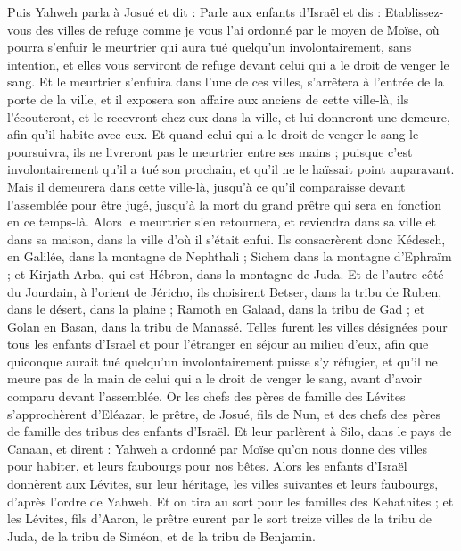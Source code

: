 \begin{multicols}{2}
\VerseOne{}Puis Yahweh parla à Josué et dit :
Parle aux enfants d'Israël et dis : Etablissez-vous des villes de refuge comme je vous l'ai ordonné par le moyen de Moïse,
où pourra s'enfuir le meurtrier qui aura tué quelqu'un involontairement, sans intention, et elles vous serviront de refuge devant celui qui a le droit de venger le sang.
Et le meurtrier s'enfuira dans l'une de ces villes, s'arrêtera à l'entrée de la porte de la ville, et il exposera son affaire aux anciens de cette ville-là, ils l'écouteront, et le recevront chez eux dans la ville, et lui donneront une demeure, afin qu'il habite avec eux.
Et quand celui qui a le droit de venger le sang le poursuivra, ils ne livreront pas le meurtrier entre ses mains ; puisque c'est involontairement qu'il a tué son prochain, et qu'il ne le haïssait point auparavant.
Mais il demeurera dans cette ville-là, jusqu'à ce qu'il comparaisse devant l'assemblée pour être jugé, jusqu'à la mort du grand prêtre qui sera en fonction en ce temps-là. Alors le meurtrier s'en retournera, et reviendra dans sa ville et dans sa maison, dans la ville d'où il s'était enfui.
Ils consacrèrent donc Kédesch, en Galilée, dans la montagne de Nephthali ; Sichem dans la montagne d'Ephraïm ; et Kirjath-Arba, qui est Hébron, dans la montagne de Juda.
Et de l'autre côté du Jourdain, à l'orient de Jéricho, ils choisirent Betser, dans la tribu de Ruben, dans le désert, dans la plaine ; Ramoth en Galaad, dans la tribu de Gad ; et Golan en Basan, dans la tribu de Manassé.
Telles furent les villes désignées pour tous les enfants d'Israël et pour l'étranger en séjour au milieu d'eux, afin que quiconque aurait tué quelqu'un involontairement puisse s'y réfugier, et qu'il ne meure pas de la main de celui qui a le droit de venger le sang, avant d'avoir comparu devant l'assemblée.
\VerseOne{}Or les chefs des pères de famille des Lévites s'approchèrent d'Eléazar, le prêtre, de Josué, fils de Nun, et des chefs des pères de famille des tribus des enfants d'Israël.
Et leur parlèrent à Silo, dans le pays de Canaan, et dirent : Yahweh a ordonné par Moïse qu'on nous donne des villes pour habiter, et leurs faubourgs pour nos bêtes.
Alors les enfants d'Israël donnèrent aux Lévites, sur leur héritage, les villes suivantes et leurs faubourgs, d'après l'ordre de Yahweh.
Et on tira au sort pour les familles des Kehathites ; et les Lévites, fils d'Aaron, le prêtre eurent par le sort treize villes de la tribu de Juda, de la tribu de Siméon, et de la tribu de Benjamin.

\end{multicols}
